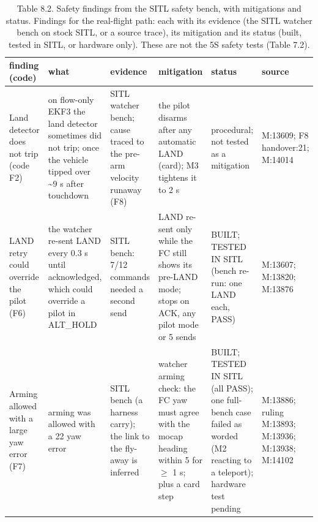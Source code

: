 \begin{table}[htbp]
\centering
\scriptsize
\caption{Table 8.2. Safety findings from the SITL safety bench, with mitigations and status. Findings for the real-flight path: each with its evidence (the SITL watcher bench on stock SITL, or a source trace), its mitigation and its status (built, tested in SITL, or hardware only). These are not the 5S safety tests (Table 7.2).}
\label{tab:8-2}
\begin{tabular}{p{}p{}p{}p{}p{}p{}}
\toprule
\textbf{finding (code)} & \textbf{what} & \textbf{evidence} & \textbf{mitigation} & \textbf{status} & \textbf{source} \\
\midrule
Land detector does not trip (code F2) & on flow-only EKF3 the land detector sometimes did not trip; once the vehicle tipped over \textasciitilde{}9 s after touchdown & SITL watcher bench; cause traced to the pre-arm velocity runaway (F8) & the pilot disarms after any automatic LAND (card); M3 tightens it to 2 s & procedural; not tested as a mitigation & M:13609; F8 handover:21; M:14014 \\
LAND retry could override the pilot (F6) & the watcher re-sent LAND every 0.3 s until acknowledged, which could override a pilot in ALT\_HOLD & SITL bench: 7/12 commands needed a second send & LAND re-sent only while the FC still shows its pre-LAND mode; stops on ACK, any pilot mode or 5 sends & BUILT; TESTED IN SITL (bench re-run: one LAND each, PASS) & M:13607; M:13820; M:13876 \\
Arming allowed with a large yaw error (F7) & arming was allowed with a 22\textdegree{} yaw error & SITL bench (a harness carry); the link to the fly-away is inferred & watcher arming check: the FC yaw must agree with the mocap heading within 5\textdegree{} for $\ge$ 1 s; plus a card step & BUILT; TESTED IN SITL (all PASS); one full-bench case failed as worded (M2 reacting to a teleport); hardware test pending & M:13886; ruling M:13893; M:13936; M:13938; M:14102 \\

\end{tabular}
\end{table}
